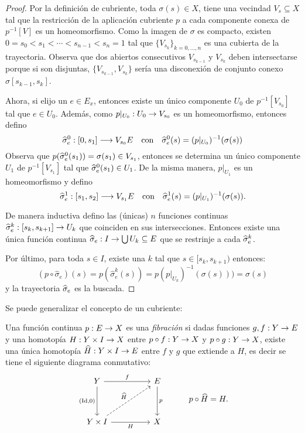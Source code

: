 \documentclass[../../topologia_algebraica]{subfiles}
\begin{document}
\begin{proof}
  Por la definici\'on de cubriente, toda $\sigma(s)\in X$, tiene una vecindad $V_s\subseteq X$
  tal que la restricci\'on de la aplicaci\'on cubriente $p$ a cada componente conexa de
  $p^{-1}[V]$ es un homeomorfismo. Como la imagen de $\sigma$ es compacto, existen
  $0=s_0<s_1<\cdots<s_{n-1}<s_n=1$ tal que $\{V_{s_k}\}_{k=0,\ldots,n}$ es una cubierta de la
  trayectoria. Observa que dos abiertos consecutivos $V_{s_{k-1}}$ y $V_{s_k}$ deben intersectarse
  porque si son disjuntas, $\{V_{s_{k-1}},V_{s_k}\}$ ser\'ia una disconexi\'on de conjunto conexo
  $\sigma[s_{k-1},s_k]$.

  Ahora, si elijo un $e\in E_x$, entonces existe un \'unico componente $U_0$ de $p^{-1}[V_{s_0}]$
  tal que $e\in U_0$. Adem\'as, como $p|_{U_0}:U_0\rightarrow V_{s_0}$ es un homeomorfismo, entonces defino
  \[
    \widehat{ \sigma }_e^0:[0,s_1]\longrightarrow V_{s_0}E \quad\text{con}\quad
    \widehat{ \sigma }_e^0(s)=(p|_{U_0})^{-1}(\sigma(s))
  \]
  Observa que $p(\widehat{ \sigma }_e^0(s_1))=\sigma(s_1)\in V_{s_1}$, entonces se determina un
  \'unico componente $U_1$ de $p^{-1}[V_{s_1}]$ tal que $\widehat{ \sigma }_e^0(s_1)\in U_1$. De la
  misma manera, $p|_{U_1}$ es un homeomorfismo y defino
  \[
    \widehat{ \sigma }_e^1:[s_1,s_2]\longrightarrow V_{s_1}E \quad\text{con}\quad
    \widehat{ \sigma }_e^1(s)=(p|_{U_1})^{-1}(\sigma(s)).
  \]

  De manera inductiva defino las (\'unicas) $n$ funciones continuas
  $\widehat{ \sigma }_e^k:[s_k,s_{k+1}]\rightarrow U_k$ que coinciden en sus intersecciones. Entonces existe una
  \'unica funci\'on continua $\widehat{ \sigma }_e:I\rightarrow \bigcup U_k\subseteq E$ que se restrinje a cada
  $\widehat{ \sigma }_e^k$.

  Por \'ultimo, para toda $s\in I$, existe una $k$ tal que $s\in[s_k,s_{k+1})$ entonces:
  \[
    (p\circ \widehat{\sigma}_e)(s)=p(\widehat{\sigma}^k_e(s))=p(p|_{U_k})^{-1}(\sigma(s)))=\sigma(s)
  \]
  y la trayectoria $\widehat{ \sigma }_e$ es la buscada.  
\end{proof}

Se puede generalizar el concepto de un cubriente:

\begin{defin}
  Una funci\'on continua $p:E\rightarrow X$ es una \emph{fibraci\'on} si dadas funciones $g,f:Y\rightarrow E$
  y una homotop\'ia  $H:Y\times I\rightarrow X$ entre $p\circ f:Y\rightarrow X$ y $p\circ g: Y\rightarrow X$, existe una
  \'unica homotop\'ia $\widehat{ H }:Y\times I\rightarrow E$ entre $f$ y $g$ que extiende a $H$, es decir
  se tiene el siguiente diagrama conmutativo:
  \[
    \begin{tikzcd}
      Y \arrow[dd,"(\Id\text{,}0)"'] \arrow[rr,"f"] && E \arrow[dd,"p"] \\ &&  \\
      Y\times I \arrow[rr,"H"'] \arrow[uurr,dashed,"\what{H}"] && X
    \end{tikzcd}
    \qquad\quad p\circ\what{H}=H.
  \]
\end{defin}
\end{document}
